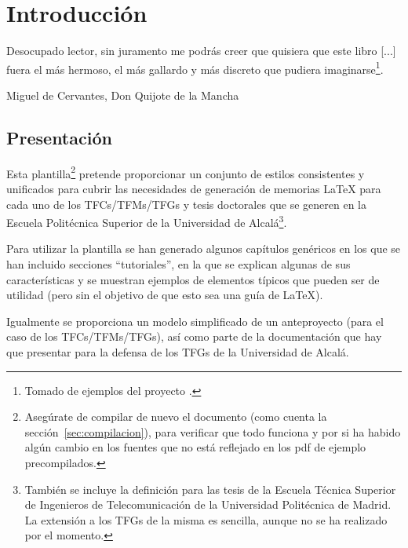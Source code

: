 
\chapter{Introducción}
\label{cha:introduccion}

\begin{FraseCelebre}
  \begin{Frase}
    Desocupado lector, sin juramento me podrás creer que quisiera que este
    libro [...] fuera el más hermoso, el más gallardo y más discreto que
    pudiera imaginarse\footnote{Tomado de ejemplos del proyecto \texis{}.}.
  \end{Frase}
  \begin{Fuente}
    Miguel de Cervantes, Don Quijote de la Mancha
  \end{Fuente}
\end{FraseCelebre}


\section{Presentación}
\label{sec:presentacion}


Esta plantilla\footnote{Asegúrate de compilar de nuevo el documento
  (como cuenta la sección~\ref{sec:compilacion}), para verificar que
  todo funciona y por si ha habido algún cambio en los fuentes que no
  está reflejado en los pdf de ejemplo precompilados.} pretende
proporcionar un conjunto de estilos consistentes y unificados para
cubrir las necesidades de generación de memorias \LaTeX{} para cada uno
de los TFCs/TFMs/TFGs y tesis doctorales que se generen en la Escuela
Politécnica Superior de la Universidad de Alcalá\footnote{También se
  incluye la definición para las tesis de la Escuela Técnica Superior de
  Ingenieros de Telecomunicación de la Universidad Politécnica de
  Madrid. La extensión a los TFGs de la misma es sencilla, aunque no se
  ha realizado por el momento.}.

Para utilizar la plantilla se han generado algunos capítulos genéricos
en los que se han incluido secciones ``tutoriales'', en la que se
explican algunas de sus características y se muestran ejemplos de
elementos típicos que pueden ser de utilidad (pero sin el objetivo de
que esto sea una guía de \LaTeX{}).

Igualmente se proporciona un modelo simplificado de un anteproyecto
(para el caso de los TFCs/TFMs/TFGs), así como parte de la documentación
que hay que presentar para la defensa de los TFGs de la Universidad de
Alcalá.



